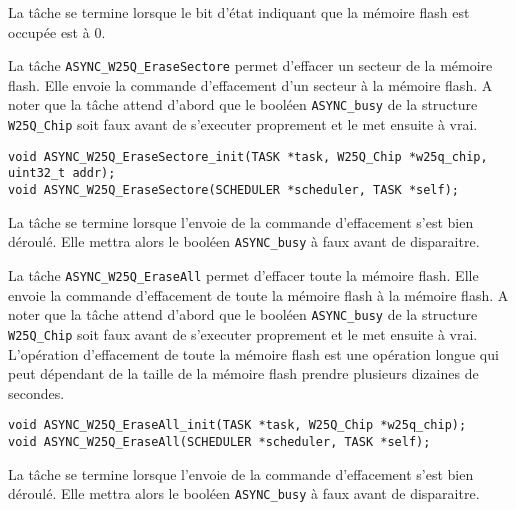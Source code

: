 La tâche se termine lorsque le bit d'état indiquant que la mémoire flash est occupée
est à 0.



La tâche \texttt{ASYNC\_W25Q\_EraseSectore} permet d'effacer un secteur de la mémoire
flash. Elle envoie la commande d'effacement d'un secteur à la mémoire flash. A noter
que la tâche attend d'abord que le booléen \texttt{ASYNC\_busy} de la structure
\texttt{W25Q\_Chip} soit faux avant de s'executer proprement et le met ensuite à vrai.

\begin{lstlisting}[style=prog, frame=shadowbox, label={lst:ASYNC_W25Q_EraseSectore},
    emph={[1]ASYNC_W25Q_EraseSectore_init, ASYNC_W25Q_EraseSectore}, emphstyle={[1]\color{C}},
    emph={[2]W25Q_Chip, SCHEDULER, TASK}, emphstyle={[2]\color{E}}]
void ASYNC_W25Q_EraseSectore_init(TASK *task, W25Q_Chip *w25q_chip, uint32_t addr);
void ASYNC_W25Q_EraseSectore(SCHEDULER *scheduler, TASK *self);
\end{lstlisting}

La tâche se termine lorsque l'envoie de la commande d'effacement s'est bien déroulé.
Elle mettra alors le booléen \texttt{ASYNC\_busy} à faux avant de disparaitre.



La tâche \texttt{ASYNC\_W25Q\_EraseAll} permet d'effacer toute la mémoire flash. Elle
envoie la commande d'effacement de toute la mémoire flash à la mémoire flash. A noter
que la tâche attend d'abord que le booléen \texttt{ASYNC\_busy} de la structure
\texttt{W25Q\_Chip} soit faux avant de s'executer proprement et le met ensuite à vrai.
L'opération d'effacement de toute la mémoire flash est une opération longue qui peut
dépendant de la taille de la mémoire flash prendre plusieurs dizaines de secondes.

\begin{lstlisting}[style=prog, frame=shadowbox, label={lst:ASYNC_W25Q_EraseAll},
    emph={[1]ASYNC_W25Q_EraseAll_init, ASYNC_W25Q_EraseAll}, emphstyle={[1]\color{C}},
    emph={[2]W25Q_Chip, SCHEDULER, TASK}, emphstyle={[2]\color{E}}]
void ASYNC_W25Q_EraseAll_init(TASK *task, W25Q_Chip *w25q_chip);
void ASYNC_W25Q_EraseAll(SCHEDULER *scheduler, TASK *self);
\end{lstlisting}

La tâche se termine lorsque l'envoie de la commande d'effacement s'est bien déroulé.
Elle mettra alors le booléen \texttt{ASYNC\_busy} à faux avant de disparaitre.

